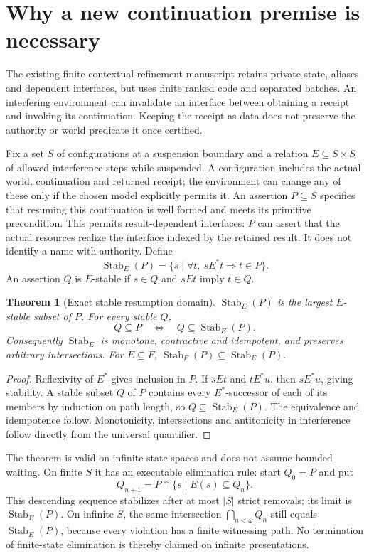 \documentclass[11pt]{article}
\newtheorem{theorem}{Theorem}[section]
\newcommand{\Stab}{\operatorname{Stab}}
\begin{document}
\section{Why a new continuation premise is necessary}
The existing finite contextual-refinement manuscript retains private state, aliases and dependent interfaces, but uses finite ranked code and separated batches. An interfering environment can invalidate an interface between obtaining a receipt and invoking its continuation. Keeping the receipt as data does not preserve the authority or world predicate it once certified.

Fix a set $S$ of configurations at a suspension boundary and a relation $E\subseteq S\times S$ of allowed interference steps while suspended. A configuration includes the actual world, continuation and returned receipt; the environment can change any of these only if the chosen model explicitly permits it. An assertion $P\subseteq S$ specifies that resuming this continuation is well formed and meets its primitive precondition. This permits result-dependent interfaces: $P$ can assert that the actual resources realize the interface indexed by the retained result. It does not identify a name with authority.
Define
\[
 \Stab_E(P)=\{s\mid \forall t,\ sE^*t\Longrightarrow t\in P\}.
\]
An assertion $Q$ is $E$-stable if $s\in Q$ and $sEt$ imply $t\in Q$.

\begin{theorem}[Exact stable resumption domain]\label{resumption:stable}
$\Stab_E(P)$ is the largest $E$-stable subset of $P$. For every stable $Q$,
\[
 Q\subseteq P\quad\Longleftrightarrow\quad Q\subseteq\Stab_E(P).
\]
Consequently $\Stab_E$ is monotone, contractive and idempotent, and preserves arbitrary intersections. For $E\subseteq F$, $\Stab_F(P)\subseteq\Stab_E(P)$.
\end{theorem}
\begin{proof}
Reflexivity of $E^*$ gives inclusion in $P$. If $sEt$ and $tE^*u$, then $sE^*u$, giving stability. A stable subset $Q$ of $P$ contains every $E^*$-successor of each of its members by induction on path length, so $Q\subseteq\Stab_E(P)$. The equivalence and idempotence follow. Monotonicity, intersections and antitonicity in interference follow directly from the universal quantifier.
\end{proof}

The theorem is valid on infinite state spaces and does not assume bounded waiting. On finite $S$ it has an executable elimination rule: start $Q_0=P$ and put
\[
 Q_{n+1}=P\cap\{s\mid E(s)\subseteq Q_n\}.
\]
This descending sequence stabilizes after at most $|S|$ strict removals; its limit is $\Stab_E(P)$. On infinite $S$, the same intersection $\bigcap_{n<\omega}Q_n$ still equals $\Stab_E(P)$, because every violation has a finite witnessing path. No termination of finite-state elimination is thereby claimed on infinite presentations.
\end{document}

